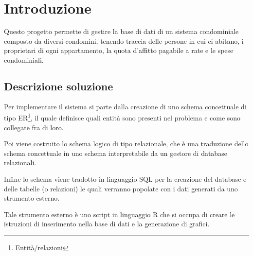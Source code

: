 \section{Introduzione}

Questo progetto permette di gestire la base di dati di
un sistema condominiale composto da diversi condomini,
tenendo traccia delle persone in cui ci abitano, i
proprietari di ogni appartamento, la quota d'affitto
pagabile a rate e le spese condominiali.

\subsection{Descrizione soluzione}

Per implementare il sistema si parte dalla creazione di uno
\hyperref[schemaER]{schema concettuale} di tipo ER\footnote{Entità/relazioni},
il quale definisce quali entità sono presenti nel problema
e come sono collegate fra di loro.

Poi viene costruito lo schema logico di tipo relazionale,
che è una traduzione dello schema concettuale in uno schema
interpretabile da un gestore di database relazionali.

Infine lo schema viene tradotto in linguaggio SQL per la
creazione del database e delle tabelle (o relazioni) le quali
verranno popolate con i dati generati da uno strumento esterno.

Tale strumento esterno è uno script in linguaggio R che si
occupa di creare le istruzioni di inserimento nella base di dati
e la generazione di grafici.
